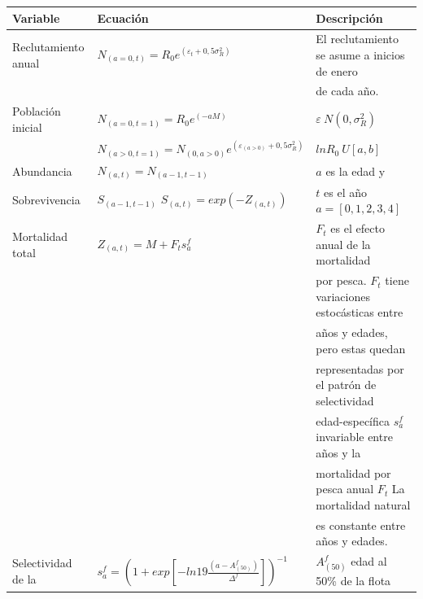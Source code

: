 \documentclass[
  spanish,
]{article}
\begin{document}
\begin{table}[h]
    \centering
    \resizebox{17cm}{!} {
    \begin{tabular}{|l|l|l|}
    \hline
Variable             &  Ecuación                                                           &    Descripción\\ \hline
Reclutamiento anual  & $N_{(a=0,t)}=R_0 e^{(\varepsilon_t+0,5\sigma_R^2)}$                 & El reclutamiento se asume a inicios de enero \\
                     &                                                                     & de cada año. \\ \hline
Población inicial    & $N_{(a=0,t=1)}=R_0e^{(-aM)}$                                        & $\varepsilon~N(0,\sigma_R^2 )$  \\
                     & $N_{(a>0,t=1)}=N_{(0,a>0)} e^{(\varepsilon_{(a>0)}+0,5\sigma_R^2)}$ & $lnR_0~U[a,b]$ \\ \hline
Abundancia           & $N_{(a,t)}=N_{(a-1,t-1)}$                                           &  $a$ es la edad y  \\
Sobrevivencia        & $S_{(a-1,t-1)}$ $S_{(a,t)}=exp(-Z_{(a,t)} )$                        &  $t$ es el año $a=[0,1,2,3,4]$ \\ \hline
Mortalidad total     & $Z_{(a,t)}=M+F_t s_a^f$                                             & $F_t$ es el efecto anual de la mortalidad \\
                     &                                                                     & por pesca. $F_t$ tiene variaciones estocásticas entre\\
                     &                                                                     & años y edades, pero estas quedan \\
                     &                                                                     & representadas por el patrón de selectividad \\
                     &                                                                     & edad-específica $s_a^f$ invariable entre años y la \\
                     &                                                                     & mortalidad por pesca anual $F_t$ La mortalidad natural \\
                     &                                                                     & es constante entre años y edades.\\ \hline
Selectividad de la   & $s_a^f=(1+exp[-ln19\frac{(a-A_{(50)}^f)}{\Delta^f}])^{-1}$          & $A_{(50)}^f$ edad al 50\% de la flota\\

\end{tabular}}
\end{table}
\end{document}
